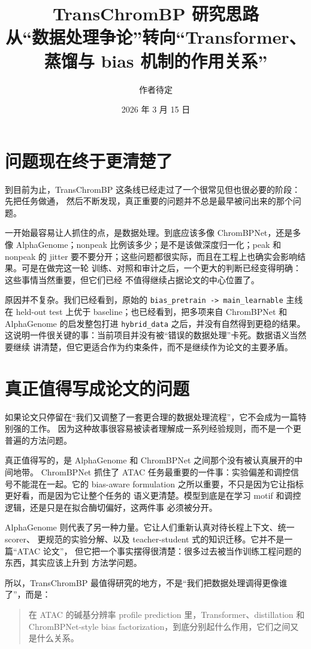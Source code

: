 \documentclass[11pt,a4paper]{ctexart}
\title{TransChromBP 研究思路\\
\large 从“数据处理争论”转向“Transformer、蒸馏与 bias 机制的作用关系”}
\author{作者待定}
\date{2026 年 3 月 15 日}
\begin{document}
\maketitle
\onehalfspacing

\section*{问题现在终于更清楚了}

到目前为止，TransChromBP 这条线已经走过了一个很常见但也很必要的阶段：先把任务做通，
然后不断发现，真正重要的问题并不总是最早被问出来的那个问题。

一开始最容易让人抓住的点，是数据处理。到底应该多像 ChromBPNet，还是多像
AlphaGenome；nonpeak 比例该多少；是不是该做深度归一化；peak 和 nonpeak 的 jitter
要不要分开；这些问题都很实际，而且在工程上也确实会影响结果。可是在做完这一轮
训练、对照和审计之后，一个更大的判断已经变得明确：这些事情当然重要，但它们已经
不值得继续占据论文的中心位置了。

原因并不复杂。我们已经看到，原始的 \texttt{bias\_pretrain -> main\_learnable}
主线在 held-out test 上优于 baseline；也已经看到，把多项来自 ChromBPNet 和
AlphaGenome 的启发整包打进 \texttt{hybrid\_data} 之后，并没有自然得到更稳的结果。
这说明一件很关键的事：当前项目并没有被“错误的数据处理”卡死。数据语义当然要继续
讲清楚，但它更适合作为约束条件，而不是继续作为论文的主要矛盾。

\section*{真正值得写成论文的问题}

如果论文只停留在“我们又调整了一套更合理的数据处理流程”，它不会成为一篇特别强的工作。
因为这种故事很容易被读者理解成一系列经验规则，而不是一个更普遍的方法问题。

真正值得写的，是 AlphaGenome 和 ChromBPNet 之间那个没有被认真展开的中间地带。
ChromBPNet 抓住了 ATAC 任务最重要的一件事：实验偏差和调控信号不能混在一起。它的
bias-aware formulation 之所以重要，不只是因为它让指标更好看，而是因为它让整个任务的
语义更清楚。模型到底是在学习 motif 和调控逻辑，还是只是在拟合酶切偏好，这两件事
必须被分开。

AlphaGenome 则代表了另一种力量。它让人们重新认真对待长程上下文、统一 scorer、
更规范的实验分解、以及 teacher-student 式的知识迁移。它并不是一篇“ATAC 论文”，
但它把一个事实摆得很清楚：很多过去被当作训练工程问题的东西，其实应该上升到
方法学问题。

所以，TransChromBP 最值得研究的地方，不是“我们把数据处理调得更像谁了”，而是：
\begin{quote}
在 ATAC 的碱基分辨率 profile prediction 里，Transformer、distillation 和
ChromBPNet-style bias factorization，到底分别起什么作用，它们之间又是什么关系。
\end{quote}
\end{document}
